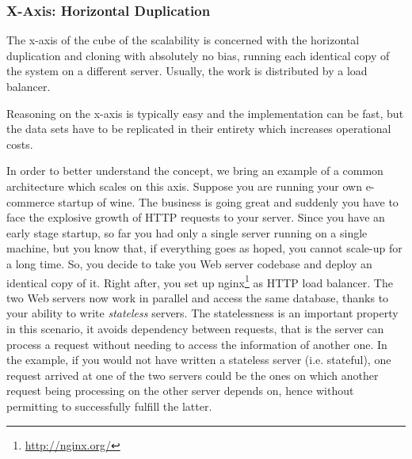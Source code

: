 \subsubsection{X-Axis: Horizontal Duplication}

The x-axis of the cube of the scalability is concerned with the horizontal
duplication and cloning with absolutely no bias, running each identical copy of
the system on a different server. Usually, the work is distributed by a load
balancer.

Reasoning on the x-axis is typically easy and the implementation can be fast,
but the data sets have to be replicated in their entirety which increases
operational costs.

In order to better understand the concept, we bring an example of a common
architecture which scales on this axis. Suppose you are running your own
e-commerce startup of wine. The business is going great and suddenly you have to
face the explosive growth of HTTP requests to your server. Since you have an
early stage startup, so far you had only a single server running on a single
machine, but you know that, if everything goes as hoped, you cannot scale-up for
a long time. So, you decide to take you Web server codebase and deploy an
identical copy of it. Right after, you set up
nginx\footnote{\url{http://nginx.org/}} as HTTP load balancer. The two Web
servers now work in parallel and access the same database, thanks to your
ability to write \emph{stateless} servers. The statelessness is an important
property in this scenario, it avoids dependency between requests, that is
the server can process a request without needing to access the information of
another one. In the example, if you would not have written a stateless server
(i.e. stateful), one request arrived at one of the two servers could be the ones
on which another request being processing on the other server depends on, hence
without permitting to successfully fulfill the latter.


